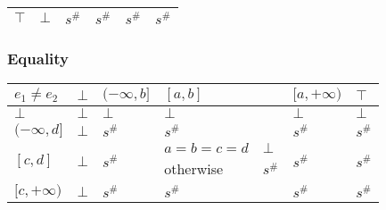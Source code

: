 \documentclass{beamer}
\begin{document}
\begin{frame}
\begin{table}
{\begin{tabular}{|l|l|ll|ll|ll|l|}
        $\top$                          & $\bot$                  & \multicolumn{2}{l|}{$s^\#$}                                                        & \multicolumn{2}{l|}{$s^\#$}                                    & \multicolumn{2}{l|}{$s^\#$}                                                  & $s^\#$                                          \\ \hline
        \end{tabular}}
        \end{table}
    \end{frame}
    
        \begin{frame}
            \frametitle{Equality}
    \begin{table}
        \begin{tabular}{|l|l|ll|ll|ll|l|}
        \hline
        $e_1 \ne e_2$                   & $\bot$                  & \multicolumn{2}{l|}{$(-\infty, b]$}          & \multicolumn{2}{l|}{$[a, b]$}                & \multicolumn{2}{l|}{$[a, +\infty)$}          & $\top$                  \\ \hline
        $\bot$                          & $\bot$                  & \multicolumn{2}{l|}{$\bot$}                  & \multicolumn{2}{l|}{$\bot$}                  & \multicolumn{2}{l|}{$\bot$}                  & $\bot$                  \\ \hline
        $(-\infty, d]$                  & $\bot$                  & \multicolumn{2}{l|}{$s^\#$}                  & $s^\#$                     &                 & \multicolumn{2}{l|}{$s^\#$}                  & $s^\#$                  \\ \hline
        \multirow{2}{*}{$[c, d]$}       & \multirow{2}{*}{$\bot$} & \multicolumn{2}{l|}{\multirow{2}{*}{$s^\#$}} & $a = b = c = d$            & $\bot$          & \multicolumn{2}{l|}{\multirow{2}{*}{$s^\#$}} & \multirow{2}{*}{$s^\#$} \\
                                        &                         & \multicolumn{2}{l|}{}                        & otherwise                  & $s^\#$          & \multicolumn{2}{l|}{}                        &                         \\ \hline
        \multirow{3}{*}{$[c, +\infty)$} & \multirow{3}{*}{$\bot$} & \multicolumn{2}{l|}{\multirow{3}{*}{$s^\#$}} & \multicolumn{2}{l|}{\multirow{3}{*}{$s^\#$}} & \multicolumn{2}{l|}{\multirow{3}{*}{$s^\#$}} & \multirow{3}{*}{$s^\#$} \\
                                        &                         & \multicolumn{2}{l|}{}                        & \multicolumn{2}{l|}{}                        & \multicolumn{2}{l|}{}                        &                         \\

\end{tabular}
\end{table}
\end{frame}
\end{document}
